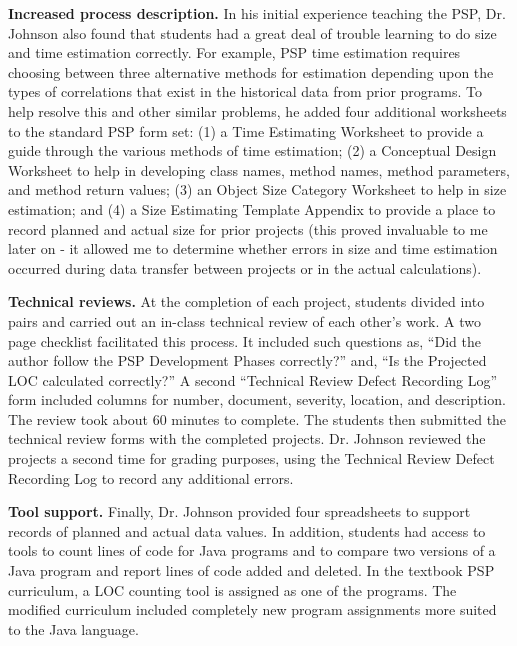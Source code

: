 {\bf Increased process description.} In his initial experience teaching the
PSP, Dr. Johnson also found that students had a great deal of trouble
learning to do size and time estimation correctly.  For example, PSP time
estimation requires choosing between three alternative methods for
estimation depending upon the types of correlations that exist in the
historical data from prior programs.  To help resolve this and other
similar problems, he added four additional worksheets to the standard PSP
form set: (1) a Time Estimating Worksheet to provide a guide through the
various methods of time estimation; (2) a Conceptual Design Worksheet to
help in developing class names, method names, method parameters, and method
return values; (3) an Object Size Category Worksheet to help in size
estimation; and (4) a Size Estimating Template Appendix to provide a place
to record planned and actual size for prior projects (this proved
invaluable to me later on - it allowed me to determine whether errors in
size and time estimation occurred during data transfer between projects or
in the actual calculations).

{\bf Technical reviews.} At the completion of each project, students
divided into pairs and carried out an in-class technical review of each
other's work.  A two page checklist facilitated this process.  It included 
such questions as, ``Did the author follow the PSP Development Phases
correctly?'' and, ``Is the Projected LOC calculated correctly?''  A second
``Technical Review Defect Recording Log'' form included columns for number, 
document, severity, location, and description.  The review took about 60
minutes to complete.  The students then submitted the technical review
forms with the completed projects.  Dr. Johnson reviewed the projects a
second time for grading purposes, using the Technical Review Defect
Recording Log to record any additional errors.

{\bf Tool support.}  Finally, Dr. Johnson provided four spreadsheets to
support records of planned and actual data values.  In addition, students
had access to tools to count lines of code for Java programs and to compare 
two versions of a Java program and report lines of code added and deleted.
In the textbook PSP curriculum, a LOC counting tool is assigned as one of
the programs.  The modified curriculum included completely new program
assignments more suited to the Java language.

